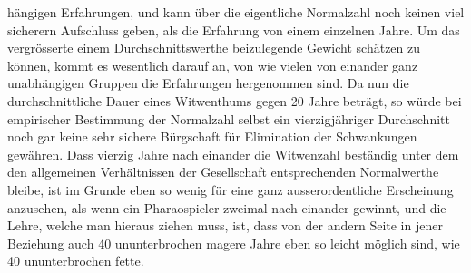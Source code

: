 %
hängigen Erfahrungen, und kann über die eigentliche Normalzahl noch keinen viel sicherern Aufschluss geben, als die Erfahrung von einem einzelnen Jahre. Um das vergrösserte einem Durchschnittswerthe beizulegende Gewicht schätzen zu können, kommt es wesentlich darauf an, von wie vielen von einander ganz unabhängigen Gruppen die Erfahrungen hergenommen sind. Da nun die durchschnittliche Dauer eines Witwenthums gegen 20 Jahre beträgt, so würde bei empirischer Bestimmung der Normalzahl selbst ein vierzigjähriger Durchschnitt noch gar keine sehr sichere Bürgschaft für Elimination der Schwankungen gewähren. Dass vierzig Jahre nach einander die Witwenzahl beständig unter dem den allgemeinen Verhältnissen der Gesellschaft entsprechenden Normalwerthe bleibe, ist im Grunde eben so wenig für eine ganz ausserordentliche Erscheinung anzusehen, als wenn ein Pharaospieler zweimal nach einander gewinnt, und die Lehre, welche man hieraus ziehen muss, ist, dass von der andern Seite in jener Beziehung auch 40 ununterbrochen magere Jahre eben so leicht möglich sind, wie 40 ununterbrochen fette.

